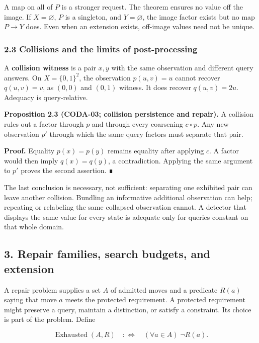 \documentclass[
  11pt,
]{article}
\begin{document}
A map on all of \(P\) is a stronger request. The theorem ensures no value off the image. If \(X=\varnothing\), \(P\) is a singleton, and \(Y=\varnothing\), the image factor exists but no map \(P\to Y\) does. Even when an extension exists, off-image values need not be unique.

\subsubsection{2.3 Collisions and the limits of post-processing}\label{collisions-and-the-limits-of-post-processing}

A \textbf{collision witness} is a pair \(x,y\) with the same observation and different query answers. On \(X=\{0,1\}^2\), the observation \(p(u,v)=u\) cannot recover \(q(u,v)=v\), as \((0,0)\) and \((0,1)\) witness. It does recover \(q(u,v)=2u\). Adequacy is query-relative.

\textbf{Proposition 2.3 (CODA-03; collision persistence and repair).} A collision rules out a factor through \(p\) and through every coarsening \(c\circ p\). Any new observation \(p'\) through which the same query factors must separate that pair.

\textbf{Proof.} Equality \(p(x)=p(y)\) remains equality after applying \(c\). A factor would then imply \(q(x)=q(y)\), a contradiction. Applying the same argument to \(p'\) proves the second assertion. ∎

The last conclusion is necessary, not sufficient: separating one exhibited pair can leave another collision. Bundling an informative additional observation can help; repeating or relabeling the same collapsed observation cannot. A detector that displays the same value for every state is adequate only for queries constant on that whole domain.

\subsection{3. Repair families, search budgets, and extension}\label{repair-families-search-budgets-and-extension}

A repair problem supplies a set \(A\) of admitted moves and a predicate \(R(a)\) saying that move \(a\) meets the protected requirement. A protected requirement might preserve a query, maintain a distinction, or satisfy a constraint. Its choice is part of the problem. Define

\[
 \operatorname{Exhausted}(A,R)
 \quad:\Longleftrightarrow\quad
 (\forall a\in A)\;\neg R(a).
\]
\end{document}
